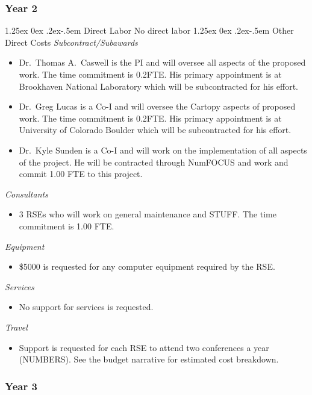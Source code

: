 \documentclass[12pt]{article}
\makeatletter
\numberwithin{page}{section}
\renewcommand{\paragraph}{%
  \@startsection{paragraph}{4}%
  {\z@}{1.25ex \@plus 0ex \@minus .2ex}{-.5em}%
  {\normalfont\normalsize\itshape\bfseries}%
}
\makeatother
\begin{document}
\subsubsection{Year 2}
\paragraph{Direct Labor}
No direct labor
\paragraph{Other Direct Costs}
\textit{Subcontract/Subawards}
\begin{itemize}
  \item Dr.\ Thomas A.\ Caswell is the PI and will oversee all aspects of the
  proposed work.  The time commitment is 0.2FTE.  His primary
  appointment is at Brookhaven National Laboratory which will be
  subcontracted for his effort.
\item Dr.\ Greg Lucas is a Co-I and will oversee the Cartopy aspects of
  proposed work.  The time commitment is 0.2FTE.  His primary appointment is at
  University of Colorado Boulder which will be subcontracted for his effort.
\item Dr.\ Kyle Sunden is a Co-I and will work on the implementation of all
  aspects of the project.  He will be contracted through NumFOCUS and work and
  commit 1.00 FTE to this project.
\end{itemize}
\textit{Consultants}
\begin{itemize}
\item 3 RSEs who will work on general maintenance and STUFF.  The time commitment is 1.00
  FTE.
\end{itemize}
\textit{Equipment}
\begin{itemize}
\item \$5000 is requested for any computer equipment required by the RSE.
\end{itemize}
\textit{Services}
\begin{itemize}
\item No support for services is requested.
\end{itemize}
\textit{Travel}
\begin{itemize}
\item Support is requested for each RSE to attend two conferences a
  year (NUMBERS).  See the budget narrative for estimated cost
  breakdown.
\end{itemize}
\subsubsection{Year 3}
\end{document}
